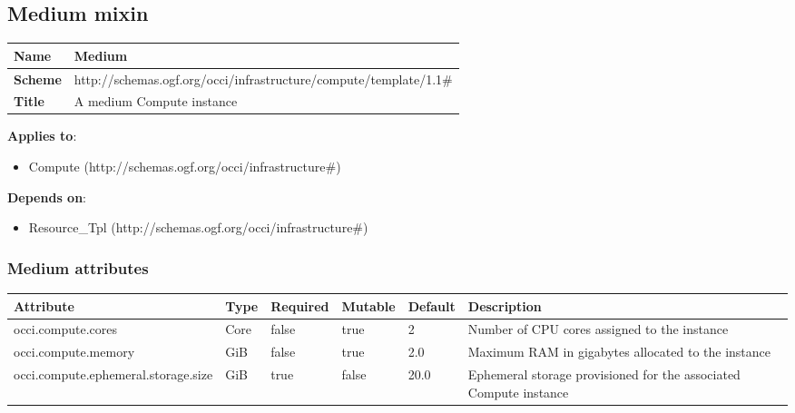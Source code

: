 \documentclass{article}
\begin{document}
\subsection{Medium mixin}
\begin{center}
\begin{tabular}{|l|l|}
  \hline
  \textbf{Name} & Medium \\
  \hline  
  \textbf{Scheme} & http://schemas.ogf.org/occi/infrastructure/compute/template/1.1\# \\
  \hline
  \textbf{Title} & A medium Compute instance \\
  \hline
\end{tabular}
\end{center}
\textbf{Applies to}:
\begin{itemize}
	\item Compute (http://schemas.ogf.org/occi/infrastructure\#)
\end{itemize}
\textbf{Depends on}:
\begin{itemize}
	\item Resource\_Tpl (http://schemas.ogf.org/occi/infrastructure\#)
\end{itemize}

\subsubsection{Medium attributes}
\begin{tabularx}{\textwidth}{|l|l|p{1.4cm}|p{1.3cm}|l|X|}
  \hline
  \textbf{Attribute} & \textbf{Type} & \textbf{Required} & \textbf{Mutable} & \textbf{Default} & \textbf{Description} \\
  \hline  
  occi.compute.cores & Core & false & true & 2 & Number of CPU cores assigned to the instance \\
  \hline
  occi.compute.memory & GiB & false & true & 2.0 & Maximum RAM in gigabytes allocated to the instance \\
  \hline
  occi.compute.ephemeral.storage.size & GiB & true & false & 20.0 & Ephemeral storage provisioned for the associated Compute instance \\
  \hline
\end{tabularx}
\end{document}
